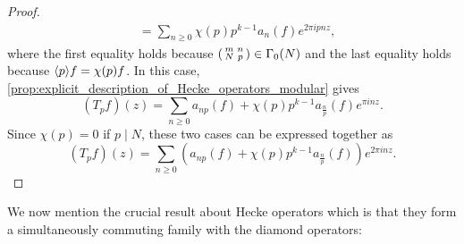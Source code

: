 \begin{proof}
\begin{align*}
          &= \sum_{n \ge 0}\chi(p)p^{k-1}a_{n}(f)e^{2\pi ipnz},
        \end{align*}
        where the first equality holds because $\begin{psmallmatrix} m & n \\ N & p \end{psmallmatrix} \in \Gamma_{0}(N)$ and the last equality holds because $\langle p\rangle f = \chi(p)f$. In this case, \cref{prop:explicit_description_of_Hecke_operators_modular} gives
        \[
          (T_{p}f)(z) = \sum_{n \ge 0}a_{np}(f)+\chi(p)p^{k-1}a_{\frac{n}{p}}(f)e^{\pi inz}.
        \]
        Since $\chi(p) = 0$ if $p \mid N$, these two cases can be expressed together as 
        \[
          (T_{p}f)(z) = \sum_{n \ge 0}\left(a_{np}(f)+\chi(p)p^{k-1}a_{\frac{n}{p}}(f)\right)e^{2\pi inz}.
        \]
      \end{proof}

      We now mention the crucial result about Hecke operators which is that they form a simultaneously commuting family with the diamond operators:

